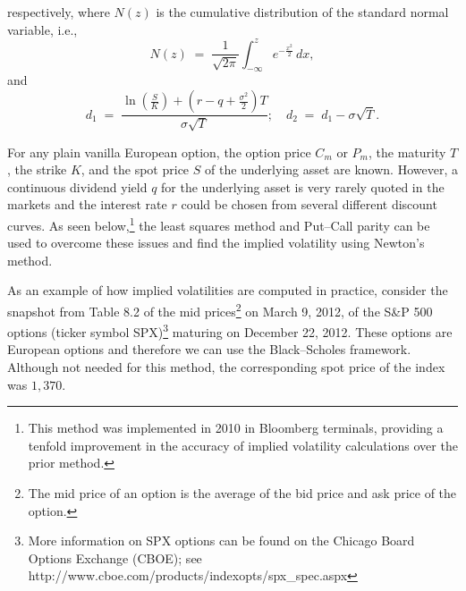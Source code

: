 
respectively, where $N(z)$ is the cumulative distribution of the standard normal
variable, i.e.,
\[
N(z) \;=\; \frac{1}{\sqrt{2\pi}} \int_{-\infty}^{z} e^{-\frac{x^2}{2}} \, dx,
\]
and
\begin{equation}
d_1 \;=\; \frac{\ln\left(\frac{S}{K}\right) + \left(r-q+\frac{\sigma^2}{2}\right)T}
{\sigma\sqrt{T}}; \quad d_2 \;=\; d_1 - \sigma\sqrt{T}.
\end{equation}

For any plain vanilla European option, the option price $C_m$ or $P_m$, the maturity
$T$, the strike $K$, and the spot price $S$ of the underlying asset are known. However,
a continuous dividend yield $q$ for the underlying asset is very rarely quoted in the
markets and the interest rate $r$ could be chosen from several different discount
curves. As seen below,\footnote{This method was implemented in 2010 in Bloomberg
terminals, providing a tenfold improvement in the accuracy of implied volatility
calculations over the prior method.} the least squares method and Put--Call parity can
be used to overcome these issues and find the implied volatility using Newton's method.

As an example of how implied volatilities are computed in practice, consider the
snapshot from Table 8.2 of the mid prices\footnote{The mid price of an option is the
average of the bid price and ask price of the option.} on March 9, 2012, of the S\&P
500 options (ticker symbol SPX)\footnote{More information on SPX options can be found
on the Chicago Board Options Exchange (CBOE); see
http://www.cboe.com/products/indexopts/spx\_spec.aspx} maturing on December 22, 2012.
These options are European options and therefore we can use the Black--Scholes
framework. Although not needed for this method, the corresponding spot price of the
index was $1,370$.

